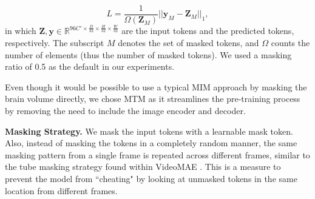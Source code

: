\vspace{-0.1in}
\begin{equation}
    L = \frac{1}{\Omega(\mathbf{Z}_M)}||\mathbf{y}_M-\mathbf{Z}_M||_1,
\end{equation}
in which $\mathbf{Z}, \mathbf{y} \in \mathbb{R}^{96C' \times \frac{D}{32} \times \frac{H}{32} \times \frac{W}{32}}$ are the input tokens and the predicted tokens, respectively. The subscript $M$ denotes the set of masked tokens, and $\Omega$ counts the number of elements (thus the number of masked tokens). We used a masking ratio of 0.5 as the default in our experiments.

Even though it would be possible to use a typical MIM approach by masking the brain volume directly, we chose MTM as it streamlines the pre-training process by removing the need to include the image encoder and decoder.

\noindent \textbf{Masking Strategy.}
We mask the input tokens with a learnable mask token.
Also, instead of masking the tokens in a completely random manner, the same masking pattern from a single frame is repeated across different frames, similar to the tube masking strategy found within VideoMAE \citep{videomae}. This is a measure to prevent the model from ``cheating" by looking at unmasked tokens in the same location from different frames.

